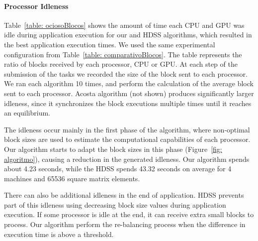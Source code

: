 \documentclass[journal]{IEEEtran}
\begin{document}
\paragraph{Processor Idleness} Table~\ref{table: ociosoBlocos} shows the amount of time each CPU and GPU was
idle during application execution for our and HDSS algorithms, which resulted in
the best application execution times. We used the same experimental
configuration from Table~\ref{table: comparativoBlocos}. The table represents the ratio of blocks received by each processor, CPU or GPU. At each step of the submission of the tasks we recorded the size of the block sent to each processor. We ran each algorithm 10 times, and perform the calculation of the average block sent to each processor.
Acosta algorithm (not
shown) produces significantly larger idleness, since it synchronizes the block
executions multiple times until it reaches an equilibrium.

The idleness occur mainly in the first phase of the algorithm, where
non-optimal block sizes are used to estimate the computational capabilities of
each processor. Our algorithm starts to adapt the block sizes in this phase
(Figure~\ref{fig: algoritmo}), causing a reduction in the generated idleness. Our algorithm 
spends about 4.23 seconds, while the HDSS spends 43.32 seconds 
on average for 4 machines and 65536 square matrix elements.

There can also be additional idleness in the end of application. HDSS prevents
part of this idleness using decreasing block size values during application
execution. If some processor is idle at the end, it can receive extra small
blocks to process. Our algorithm perform the re-balancing process when the
difference in execution time is above a threshold. 




%	
\end{document}
